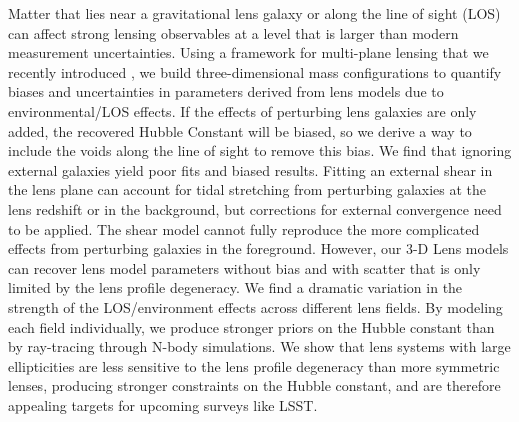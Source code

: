 Matter that lies near a gravitational lens galaxy or along the line of sight (LOS) can affect strong lensing observables at a level that is larger than modern measurement uncertainties. Using a framework for multi-plane lensing that we recently introduced \citep{McCully14}, we build three-dimensional mass configurations to quantify biases and uncertainties in parameters derived from lens models due to environmental/LOS effects. If the effects of perturbing lens galaxies are only added, the recovered Hubble Constant will be biased, so we derive a way to include the voids along the line of sight to remove this bias. We find that ignoring external galaxies yield poor fits and biased results. Fitting an external shear in the lens plane can account for tidal stretching from perturbing galaxies at the lens redshift or in the background, but corrections for external convergence need to be applied. The shear model cannot fully reproduce the more complicated effects from perturbing galaxies in the foreground. However, our 3-D Lens models can recover lens model parameters without bias and with scatter that is only limited by the lens profile degeneracy. We find a dramatic variation in the strength of the LOS/environment effects across different lens fields. By modeling each field individually, we produce stronger priors on the Hubble constant than by ray-tracing through N-body simulations.  We show that lens systems with large ellipticities are less sensitive to the lens profile degeneracy than more symmetric lenses, producing stronger constraints on the Hubble constant, and are therefore appealing targets for upcoming surveys like LSST.
  
  
  